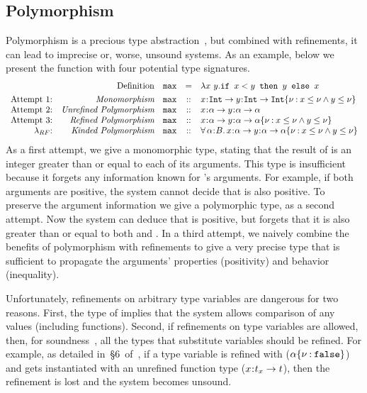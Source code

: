 \subsection{Polymorphism}
\label{subsec:overview:polymorphism}

Polymorphism is a precious type
abstraction~\cite{10.1145/99370.99404},
but combined with refinements, it can lead to
imprecise or, worse, unsound systems.
%
As an example, below we present the
function  with four potential
type signatures.
%
$$\begin{array}{rrrcl}
& \text{Definition} &  \texttt{max} &  = & \lambda x\ y . \texttt{if } x < y \texttt{ then } y \texttt{ else } x \\[0.05in]
\text{Attempt 1:}& \textit{Monomorphism} & \texttt{max} & :: &
x\hspace{0.05em}{:}\hspace{0.05em} \texttt{Int} \rightarrow y\hspace{0.05em}{:}\hspace{0.05em} \texttt{Int} \rightarrow {\ensuremath{{\texttt{Int}}\{\nu \mathbin{:} x \leq \nu \wedge y \leq \nu\}}}\\
\text{Attempt 2:}& \textit{Unrefined Polymorphism} & \texttt{max} &  :: &
x\hspace{0.05em}{:}\hspace{0.05em} \alpha \rightarrow y\hspace{0.05em}{:}\hspace{0.05em} \alpha \rightarrow \alpha\\
\text{Attempt 3:}& \textit{Refined Polymorphism} & \texttt{max} &  :: &
x\hspace{0.05em}{:}\hspace{0.05em} \alpha \rightarrow y\hspace{0.05em}{:}\hspace{0.05em} \alpha \rightarrow {\ensuremath{{\alpha}\{\nu \mathbin{:} x \leq \nu \wedge y \leq \nu\}}}\\
\lambda_{RF}\text{:} & \textit{Kinded Polymorphism} & \texttt{max} &  :: &
\forall\, \alpha\hspace{0.05em}{:}\hspace{0.05em} B.\, x\hspace{0.05em}{:}\hspace{0.05em} \alpha \rightarrow y\hspace{0.05em}{:}\hspace{0.05em} \alpha \rightarrow {\ensuremath{{\alpha}\{\nu \mathbin{:} x \leq \nu \wedge y \leq \nu\}}}
\end{array}$$
As a first attempt, we give  a monomorphic type,
stating that the result of   is an integer greater than
or equal to each of its arguments.
This type is insufficient because it forgets any information known for
's arguments. For example, if both arguments are positive,
the system cannot decide that  is also positive.
%
To preserve the argument information we give  a polymorphic
type, as a second attempt. Now the system can deduce that
 is positive, but forgets that it is also
greater than or equal to both  and .
In a third attempt, we naively combine the benefits of
polymorphism with refinements to give  a very precise type
that is sufficient to propagate the arguments' properties (positivity)
and  behavior (inequality).

Unfortunately, refinements on arbitrary type
variables are dangerous for two reasons.
%
First, the type of  implies
that the system allows comparison
of any values (including functions).
%
Second, if refinements on type variables
are allowed, then, for soundness~\cite{Belo11},
all the types that substitute variables should be refined.
%
For example, as detailed in~\S 6~of~\cite{sprite}, if a type variable
is refined with \tfalse (\ie ${{\alpha}\{\nu \mathbin{:} \mathtt{false}\}}$)
and gets instantiated with an unrefined function
type ($x\hspace{0.05em}{:}\hspace{0.05em} t_x \rightarrow t$),
then the \tfalse refinement
is lost and the system becomes unsound.

